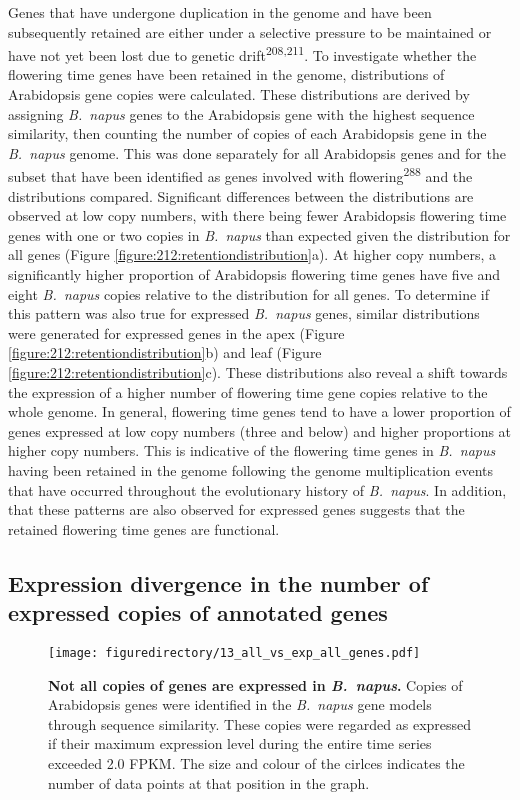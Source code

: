 \documentclass[12pt,]{book}
\begin{document}
Genes that have undergone duplication in the genome and have been
subsequently retained are either under a selective pressure to be
maintained or have not yet been lost due to genetic
drift\textsuperscript{208,211}. To investigate whether the flowering
time genes have been retained in the genome, distributions of
Arabidopsis gene copies were calculated. These distributions are derived
by assigning \emph{B.~napus} genes to the Arabidopsis gene with the
highest sequence similarity, then counting the number of copies of each
Arabidopsis gene in the \emph{B.~napus} genome. This was done separately
for all Arabidopsis genes and for the subset that have been identified
as genes involved with flowering\textsuperscript{288} and the
distributions compared. Significant differences between the
distributions are observed at low copy numbers, with there being fewer
Arabidopsis flowering time genes with one or two copies in
\emph{B.~napus} than expected given the distribution for all genes
(Figure \ref{figure:212:retentiondistribution}a). At higher copy
numbers, a significantly higher proportion of Arabidopsis flowering time
genes have five and eight \emph{B.~napus} copies relative to the
distribution for all genes. To determine if this pattern was also true
for expressed \emph{B.~napus} genes, similar distributions were
generated for expressed genes in the apex (Figure
\ref{figure:212:retentiondistribution}b) and leaf (Figure
\ref{figure:212:retentiondistribution}c). These distributions also
reveal a shift towards the expression of a higher number of flowering
time gene copies relative to the whole genome. In general, flowering
time genes tend to have a lower proportion of genes expressed at low
copy numbers (three and below) and higher proportions at higher copy
numbers. This is indicative of the flowering time genes in
\emph{B.~napus} having been retained in the genome following the genome
multiplication events that have occurred throughout the evolutionary
history of \emph{B.~napus}. In addition, that these patterns are also
observed for expressed genes suggests that the retained flowering time
genes are functional.

\subsection{Expression divergence in the number of expressed copies of
annotated genes}\label{section:spring:expressedvsannotated}

\begin{figure}[htbp]
\centering
\texttt{[image: figuredirectory/13\_all\_vs\_exp\_all\_genes.pdf]}
\caption{\textbf{Not all copies of genes are expressed in
\emph{B.~napus}.} Copies of Arabidopsis genes were identified in the
\emph{B.~napus} gene models through sequence similarity. These copies
were regarded as expressed if their maximum expression level during the
entire time series exceeded 2.0 FPKM. The size and colour of the cirlces
indicates the number of data points at that position in the
graph.}\label{figure:213:allvsexp}
\end{figure}
\end{document}

